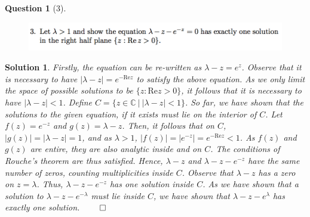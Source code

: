 \documentclass{article} %
\theoremstyle{quest}
\newtheorem*{question}{Question}
\newtheorem*{solution}{Solution}
\begin{document}
\begin{question}[3]
\hfill
\begin{figure}[h!]
\centering
\includegraphics[width=1\textwidth]{cv-9-3}
\end{figure}
\end{question}
\begin{solution}
Firstly, the equation can be re-written as $\lambda - z = e^{z}$.
Observe that it is necessary to have
$| \lambda - z | = e^{-\text{Re} z}$ to satisfy the above equation.
As we only limit the space of possible solutions to be $\{ z : \text{Re} z 
> 0\}$, it follows that it is necessary to have $|\lambda - z | < 1$.
Define $C = \{ z \in \mathbb{C} \> | \> | \lambda - z| < 1 \}$. So far,
we have shown that the solutions to the given equation, if it exists
must lie on the interior of $C$. 
Let $f(z) = e^{-z}$
and $g(z) = \lambda - z $. Then, it follows that on $C$, $|g(z)| = |\lambda
-z | = 1$, and as $\lambda > 1$, $|f(z)| = |e^{-z}| = e^{-\text{Re}z} < 1$. 
As $f(z)$ and $g(z)$ are entire, they are also analytic inside
and on $C$. The conditions of Rouche's theorem are thus satisfied. Hence,
$\lambda - z$ and $\lambda - z - e^{-z}$ have the same number of zeros, 
counting multiplicities inside $C$. Observe that $\lambda - z$ has a 
zero on $z = \lambda$. Thus, $\lambda -z -e^{-z}$ has one solution
inside $C$. As we have shown that a solution to $\lambda -z -e^{-\lambda}$
must lie inside $C$, we have shown that $\lambda -z -e^{\lambda}$ has
exactly one solution. \hfill $\qed$

\end{solution}

\bigskip
\end{document}
